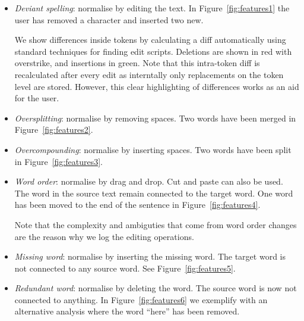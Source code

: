 \documentclass[10pt, a4paper]{article}
\newcommand{\dan}[1]{{\color{Fuchsia}{Dan: #1}}}
\begin{document}
\begin{itemize}
\item {\it Deviant spelling}: normalise by editing the text.
In Figure~\ref{fig:features1} the user has removed a character and inserted two new.

We show differences inside tokens by
calculating a diff automatically using standard techniques for finding
edit scripts.  Deletions are shown in red with overstrike, and insertions
in green. %
Note that this intra-token diff is recalculated after every edit
as interntally only replacements on the token level are stored.  However,
this clear highlighting of differences works as an aid for the user.

\item {\it Oversplitting}: normalise by removing spaces.
Two words have been merged in Figure~\ref{fig:features2}.

\item {\it Overcompounding}: normalise by inserting spaces.
Two words have been split in Figure~\ref{fig:features3}.

\item {\it Word order}: normalise by drag and drop. Cut and paste can also be used.
The word in the source text remain connected to the target word.
One word has been moved to the end of the sentence in Figure~\ref{fig:features4}.

Note that the complexity and ambiguties that come from word order changes
are the reason why we log the editing operations.


\item {\it Missing word}: normalise by inserting the missing word.
The target word is not connected to any source word.
See Figure~\ref{fig:features5}.

\item {\it Redundant word}: normalise by deleting the word.
The source word is now not connected to anything.
In Figure~\ref{fig:features6} we exemplify with
an alternative analysis where the word ``here'' has been removed.

\end{itemize}
\end{document}
